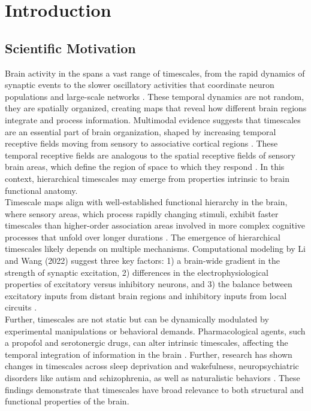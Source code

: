 \documentclass[latex/main.tex]{subfiles}
\begin{document}
\section{Introduction}

\subsection{Scientific Motivation} 
Brain activity in the spans a vast range of timescales, from the rapid dynamics of synaptic events to the slower oscillatory activities that coordinate neuron populations and large-scale networks \cite{buzsaki_large-scale_2004}. These temporal dynamics are not random, they are spatially organized, creating maps that reveal how different brain regions integrate and process information. Multimodal evidence suggests that timescales are an essential part of brain organization, shaped by increasing temporal receptive fields moving from sensory to associative cortical regions \cite{raut_hierarchical_2020, gao_neuronal_2020, hasson_hierarchy_2008}. These temporal receptive fields are analogous to the spatial receptive fields of sensory brain areas, which define the region of space to which they respond \cite{hubel_receptive_1959}. In this context, hierarchical timescales may emerge from properties intrinsic to brain functional anatomy.\\

Timescale maps align with well-established functional hierarchy in the brain, where sensory areas, which process rapidly changing stimuli, exhibit faster timescales than higher-order association areas involved in more complex cognitive processes that unfold over longer durations \cite{murray_hierarchy_2014, hasson_hierarchy_2008, stephens_place_2013}. The emergence of hierarchical timescales likely depends on multiple mechanisms. Computational modeling by Li and Wang (2022) suggest three key factors: 1) a brain-wide gradient in the strength of synaptic excitation, 2) differences in the electrophysiological properties of excitatory versus inhibitory neurons, and 3) the balance between excitatory inputs from distant brain regions and inhibitory inputs from local circuits \cite{li_hierarchical_2022}.\\

Further, timescales are not static but can be dynamically modulated by experimental manipulations or behavioral demands. Pharmacological agents, such a propofol and serotonergic drugs, can alter intrinsic timescales, affecting the temporal integration of information in the brain \cite{huang_timescales_2018, shinn_functional_2023}. Further, research has shown changes in timescales across sleep deprivation and wakefulness, neuropsychiatric disorders like autism and schizophrenia, as well as naturalistic behaviors \cite{meisel_decline_2017, watanabe_atypical_2019, wengler_distinct_2020, manea_neural_2024}. These findings demonstrate that timescales have broad relevance to both structural and functional properties of the brain.\\
\end{document}
